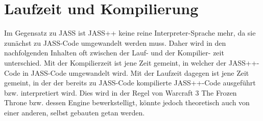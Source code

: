 \chapter{Laufzeit und Kompilierung}
Im Gegensatz zu JASS ist JASS++ keine reine Interpreter-Sprache mehr, da sie zunächst zu JASS-Code
umgewandelt werden muss. Daher wird in den nachfolgenden Inhalten oft zwischen der Lauf- und der Kompilier-
zeit unterschied. Mit der Kompilierzeit ist jene Zeit gemeint, in welcher der JASS++-Code in JASS-Code
umgewandelt wird. Mit der Laufzeit dagegen ist jene Zeit gemeint, in der der bereits zu JASS-Code kompilierte
JASS++-Code ausgeführt bzw. interpretiert wird. Dies wird in der Regel von Warcraft 3 The Frozen Throne bzw. dessen Engine
bewerkstelligt, könnte jedoch theoretisch auch von einer anderen, selbst gebauten getan werden.
